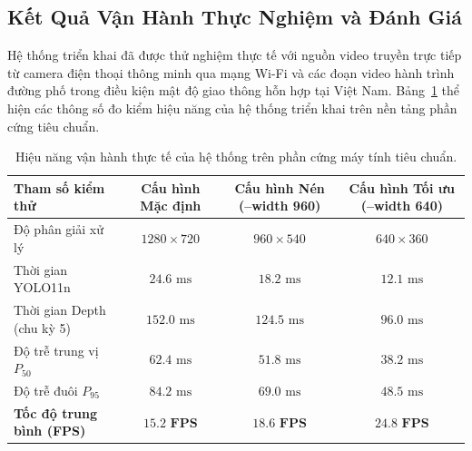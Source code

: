 \subsection{Kết Quả Vận Hành Thực Nghiệm và Đánh Giá}
\label{subsec:ket_qua_thuc_nghiem}

Hệ thống triển khai đã được thử nghiệm thực tế với nguồn video truyền trực tiếp từ camera điện thoại thông minh qua mạng Wi-Fi và các đoạn video hành trình đường phố trong điều kiện mật độ giao thông hỗn hợp tại Việt Nam. Bảng~\ref{tab:experimental_performance} thể hiện các thông số đo kiểm hiệu năng của hệ thống triển khai trên nền tảng phần cứng tiêu chuẩn.

\begin{table}[htbp]
\centering
\caption{Hiệu năng vận hành thực tế của hệ thống trên phần cứng máy tính tiêu chuẩn.}
\label{tab:experimental_performance}
\begin{tabular}{|l|c|c|c|}
\hline
\textbf{Tham số kiểm thử} & \textbf{Cấu hình Mặc định} & \textbf{Cấu hình Nén (--width 960)} & \textbf{Cấu hình Tối ưu (--width 640)} \\ \hline
Độ phân giải xử lý & $1280 \times 720$ & $960 \times 540$ & $640 \times 360$ \\ \hline
Thời gian YOLO11n & $24.6\text{ ms}$ & $18.2\text{ ms}$ & $12.1\text{ ms}$ \\ \hline
Thời gian Depth (chu kỳ 5) & $152.0\text{ ms}$ & $124.5\text{ ms}$ & $96.0\text{ ms}$ \\ \hline
Độ trễ trung vị $P_{50}$ & $62.4\text{ ms}$ & $51.8\text{ ms}$ & $38.2\text{ ms}$ \\ \hline
Độ trễ đuôi $P_{95}$ & $84.2\text{ ms}$ & $69.0\text{ ms}$ & $48.5\text{ ms}$ \\ \hline
\textbf{Tốc độ trung bình (FPS)} & $\mathbf{15.2\text{ FPS}}$ & $\mathbf{18.6\text{ FPS}}$ & $\mathbf{24.8\text{ FPS}}$ \\ \hline
\end{tabular}
\end{table}


